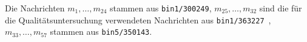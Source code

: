 Die Nachrichten $m_1, \dots, m_{24}$ stammen aus \texttt{bin1/300249}, $m_{25}, \dots, m_{32}$ sind die für die Qualitätsuntersuchung verwendeten Nachrichten aus \texttt{bin1/363227}~, $m_{33}, \dots, m_{57}$ stammen aus \texttt{bin5/350143}.
